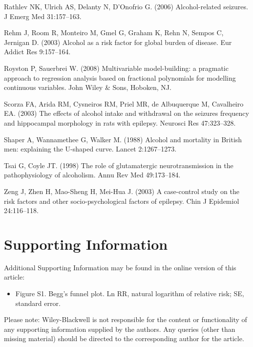 \documentclass{article}
\begin{document}
Rathlev NK, Ulrich AS, Delanty N, D’Onofrio G. (2006) Alcohol-related seizures. J Emerg Med 31:157–163.

Rehm J, Room R, Monteiro M, Gmel G, Graham K, Rehn N, Sempos C, Jernigan D. (2003) Alcohol as a risk factor for global burden of disease. Eur Addict Res 9:157–164.

Royston P, Sauerbrei W. (2008) Multivariable model-building: a pragmatic approach to regression analysis based on fractional polynomials for modelling continuous variables. John Wiley \& Sons, Hoboken, NJ.

Scorza FA, Arida RM, Cysneiros RM, Priel MR, de Albuquerque M, Cavalheiro EA. (2003) The effects of alcohol intake and withdrawal on the seizures frequency and hippocampal morphology in rats with epilepsy. Neurosci Res 47:323–328.

Shaper A, Wannamethee G, Walker M. (1988) Alcohol and mortality in British men: explaining the U-shaped curve. Lancet 2:1267–1273.

Tsai G, Coyle JT. (1998) The role of glutamatergic neurotransmission in the pathophysiology of alcoholism. Annu Rev Med 49:173–184.

Zeng J, Zhen H, Mao-Sheng H, Mei-Hua J. (2003) A case-control study on the risk factors and other socio-psychological factors of epilepsy. Chin J Epidemiol 24:116–118.

\section*{Supporting Information}
Additional Supporting Information may be found in the
online version of this article:
\begin{itemize}
    \item Figure S1. Begg’s funnel plot. Ln RR, natural logarithm
    of relative risk; SE, standard error.
\end{itemize}
Please note: Wiley-Blackwell is not responsible for the
content or functionality of any supporting information supplied by the authors. Any queries (other than missing material) should be directed to the corresponding author for the
article.
\end{document}
